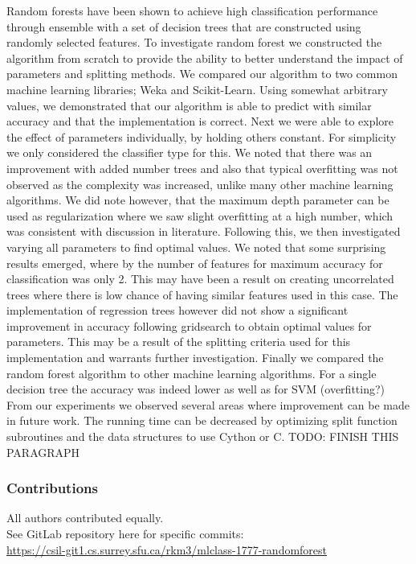 \documentclass{article} %
\begin{document}
Random forests have been shown to achieve high classification performance through ensemble with a set of decision trees that are constructed using randomly selected features. To investigate random forest we constructed the algorithm from scratch to provide the ability to better understand the impact of parameters and splitting methods. We compared our algorithm to two common machine learning libraries; Weka and Scikit-Learn. Using somewhat arbitrary values, we demonstrated that our algorithm is able to predict with similar accuracy and that the implementation is correct. Next we were able to explore the effect of parameters individually, by holding others constant. For simplicity we only considered the classifier type for this. We noted that there was an improvement with added number trees and also that typical overfitting was not observed as the complexity was increased, unlike many other machine learning algorithms. We did note however, that the maximum depth parameter can be used as regularization where we saw slight overfitting at a high number, which was consistent with discussion in literature. Following this, we then investigated varying all parameters to find optimal values. We noted that some surprising results emerged, where by the number of features for maximum accuracy for classification was only 2. This may have been a result on creating uncorrelated trees where there is low chance of having similar features used in this case. The implementation of regression trees however did not show a significant improvement in accuracy following gridsearch to obtain optimal values for parameters. This may be a result of the splitting criteria used for this implementation and warrants further investigation. Finally we compared the random forest algorithm to other machine learning algorithms. For a single decision tree the accuracy was indeed lower as well as for SVM (overfitting?)
From our experiments we observed several areas where improvement can be made in future work. The running time can be decreased by optimizing split function subroutines and the data structures to use Cython or C.
TODO: FINISH THIS PARAGRAPH

\subsubsection*{Contributions}
All authors contributed equally.\\
See GitLab repository here for specific commits:\\
\href{
    https://csil-git1.cs.surrey.sfu.ca/rkm3/mlclass-1777-randomforest
}{
    https://csil-git1.cs.surrey.sfu.ca/rkm3/mlclass-1777-randomforest
}


\small{


}
\end{document}
